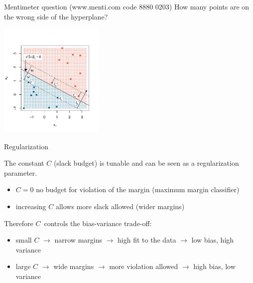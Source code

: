 \documentclass[notes]{beamer}          %
\begin{document}
\begin{frame}{Mentimeter question (www.menti.com code 8880 0203)}
How many points are on the wrong side of the hyperplane?
\begin{center}
\includegraphics[height=5.5cm]{../figures/week_2_classification/svm_support_vector_classifier.pdf}  
\end{center}
\end{frame}

\begin{frame}{Regularization}

The constant $C$ (slack budget) is tunable and can be seen as a regularization parameter.

\begin{itemize}
    \item $C = 0$ no budget for violation of the margin (maximum margin classifier)
    \item increasing $C$ allows more slack allowed (wider margins)
\end{itemize}

Therefore $C$\ controls the bias-variance trade-off:

\begin{itemize}
    \item small $C$ $\rightarrow$ narrow margins $\rightarrow$ high fit to the data $\rightarrow$ low bias, high variance
    \item large $C$ $\rightarrow$ wide margins $\rightarrow$ more violation allowed $\rightarrow$ high bias, low variance
\end{itemize}

\end{frame}
\end{document}
